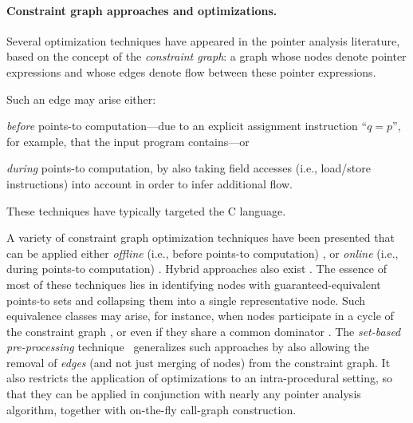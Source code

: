 
\paragraph{Constraint graph approaches and optimizations.}

Several optimization techniques have appeared in the pointer analysis
literature, based on the concept of the \emph{constraint graph}: a
graph whose nodes denote pointer expressions and whose edges denote
flow between these pointer expressions.

Such an edge may arise either:
\begin{inparaenum}[(i)]
\item \emph{before} points-to computation---due to an explicit
  assignment instruction ``$q = p$'', for example, that the input
  program contains---or
\item \emph{during} points-to computation, by also taking field
  accesses (i.e., load/store instructions) into account in order to
  infer additional flow.
\end{inparaenum}
These techniques have typically targeted the C language.

A variety of constraint graph optimization techniques have been
presented that can be applied either \emph{offline} (i.e., before
points-to computation) \cite{sas/HardekopfL07,rountevOffline}, or
\emph{online} (i.e., during points-to computation)
\cite{pldi/FahndrichFSA98}. Hybrid approaches also exist
\cite{antgrasshopper}. The essence of most of these techniques lies
in identifying nodes with guaranteed-equivalent points-to sets and
collapsing them into a single representative node. Such equivalence
classes may arise, for instance, when nodes participate in a cycle of
the constraint graph
\cite{pldi/FahndrichFSA98,pldi/HeintzeT01a}, or even if
they share a common dominator \cite{ismm/Nasre12}. The
\emph{set-based pre-processing}
technique~\cite{oopsla/SmaragdakisBK13} generalizes such
approaches by also allowing the removal of \emph{edges} (and not just
merging of nodes) from the constraint graph. It also restricts the
application of optimizations to an intra-procedural setting, so that
they can be applied in conjunction with nearly any pointer analysis
algorithm, together with on-the-fly call-graph construction.


